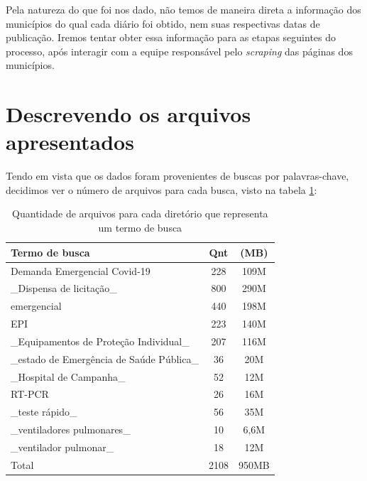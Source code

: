 \documentclass[10pt, a4paper]{article}
\begin{document}
Pela natureza do que foi nos dado, não temos de maneira direta a informação dos municípios do qual cada diário foi obtido, nem suas respectivas datas de publicação. Iremos tentar obter essa informação para as etapas seguintes do processo, após interagir com a equipe responsável pelo \textit{scraping} das páginas dos municípios. 


\section{Descrevendo os arquivos apresentados} 


Tendo em vista que os dados foram provenientes de buscas por palavras-chave, decidimos ver o número de arquivos para cada busca, visto na tabela \ref{tab:quantidade_arquivo_p_pasta}:

\begin{table}[H]
    \centering
    \centering
    \begin{tabular}{|l|c|c|}
    \hline
        Termo de busca                            & Qnt & (MB) \\ \hline
        Demanda Emergencial Covid-19              & 228 & 109M \\
        \_Dispensa de licitação\_                 & 800 & 290M \\
        emergencial                               & 440 & 198M \\
        EPI                                       & 223 & 140M \\
        \_Equipamentos de Proteção Individual\_   & 207 & 116M \\
        \_estado de Emergência de Saúde Pública\_ & 36 & 20M \\
        \_Hospital de Campanha\_                  & 52 & 12M \\
        RT-PCR                                    & 26 & 16M \\
        \_teste rápido\_                          & 56 & 35M \\
        \_ventiladores pulmonares\_               & 10 & 6,6M \\
        \_ventilador pulmonar\_                   & 18 & 12M \\ \hline
        Total                                     & 2108 & 950MB \\ \hline

    \end{tabular}
    \caption{Quantidade de arquivos para cada diretório que representa um termo de busca}
    \label{tab:quantidade_arquivo_p_pasta}
\end{table}
\end{document}

